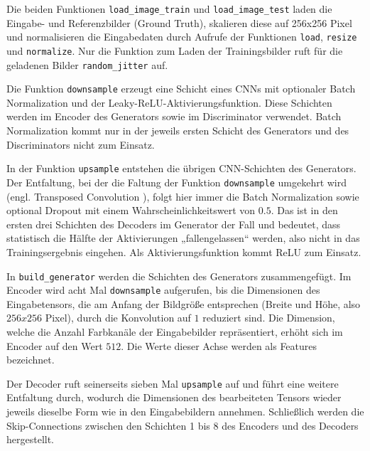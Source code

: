 Die beiden Funktionen \lstinline|load_image_train| und \lstinline|load_image_test| laden die Eingabe- und Referenzbilder (Ground Truth), skalieren diese auf 256x256 Pixel und normalisieren die Eingabedaten durch Aufrufe der Funktionen \lstinline|load|, \lstinline|resize| und \lstinline|normalize|. Nur die Funktion zum Laden der Trainingsbilder ruft für die geladenen Bilder \lstinline|random_jitter| auf.

Die Funktion \lstinline|downsample| erzeugt eine Schicht eines CNNs mit optionaler Batch Normalization und der Leaky-ReLU-Aktivierungsfunktion. Diese Schichten werden im Encoder des Generators sowie im Discriminator verwendet. Batch Normalization kommt nur in der jeweils ersten Schicht des Generators und des Discriminators nicht zum Einsatz.

In der Funktion \lstinline|upsample| entstehen die übrigen CNN-Schichten des Generators. Der Entfaltung, bei der die Faltung der Funktion \lstinline|downsample| umgekehrt wird (engl. Transposed Convolution \cite{zaccone2018tensorflow}), folgt hier immer die Batch Normalization sowie optional Dropout mit einem Wahrscheinlichkeitswert von $0.5$. Das ist in den ersten drei Schichten des Decoders im Generator der Fall und bedeutet, dass statistisch die Hälfte der Aktivierungen „fallengelassen“ werden, also nicht in das Trainingsergebnis eingehen. Als Aktivierungsfunktion kommt ReLU zum Einsatz.

In \lstinline|build_generator| werden die Schichten des Generators zusammengefügt. Im Encoder wird acht Mal \lstinline|downsample| aufgerufen, bis die Dimensionen des Eingabetensors, die am Anfang der Bildgröße entsprechen (Breite und Höhe, also $256x256$ Pixel), durch die Konvolution auf $1$ reduziert sind. Die Dimension, welche die Anzahl Farbkanäle der Eingabebilder repräsentiert, erhöht sich im Encoder auf den Wert $512$. Die Werte dieser Achse werden als Features \cite{zhang2020dive} \cite{chollet2021deep} \cite{zaccone2018tensorflow} bezeichnet.

Der Decoder ruft seinerseits sieben Mal \lstinline|upsample| auf und führt eine weitere Entfaltung durch, wodurch die Dimensionen des bearbeiteten Tensors wieder jeweils dieselbe Form wie in den Eingabebildern annehmen. Schließlich werden die Skip-Connections zwischen den Schichten 1 bis 8 des Encoders und des Decoders hergestellt.

